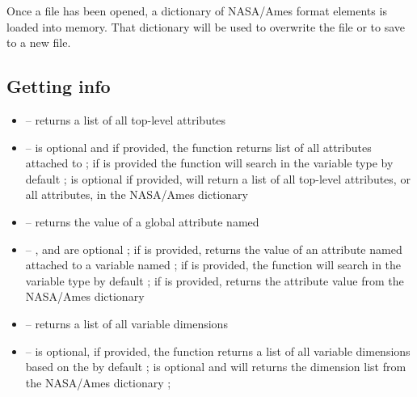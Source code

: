 \documentclass[a4paper,10pt,openany,english]{sphinxmanual}
\begin{document}
Once a file has been opened, a dictionary of NASA/Ames format elements is loaded into memory. That dictionary will be used to overwrite the file or to save to a new file.


\subsection{Getting info}
\label{tutorial:id14}\begin{itemize}
\item {} 
 -- returns a list of all top-level attributes

\item {} 
 --  is optional and if provided, the function returns list of all attributes attached to  ; if  is provided the function will search in the variable type  by default ;  is optional if provided, will return a list of all top-level attributes, or all  attributes, in the NASA/Ames dictionary 

\item {} 
 -- returns the value of a global attribute named 

\item {} 
 -- ,  and  are optional ; if  is provided, returns the value of an attribute named  attached to a variable named  ; if  is provided, the function will search in the variable type  by default ; if  is provided, returns the attribute value from the NASA/Ames dictionary 

\item {} 
 -- returns a list of all variable dimensions

\item {} 
 --  is optional, if provided, the function returns a list of all variable dimensions based on the  by default ;  is optional and will returns the dimension list from the NASA/Ames dictionary  ;


\end{itemize}
\end{document}
